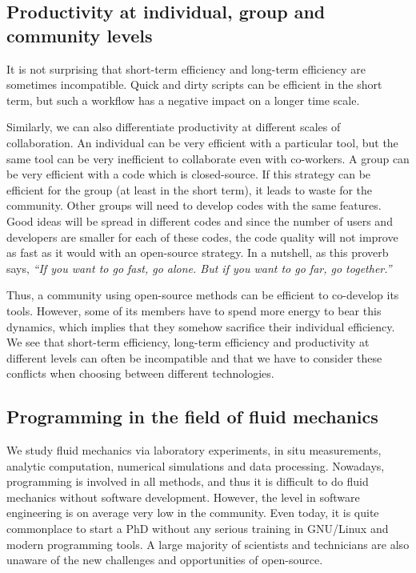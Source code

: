 \subsection{Productivity at individual, group and community levels}

It is not surprising
%
that short-term efficiency and long-term efficiency are
sometimes incompatible.
%
Quick and dirty scripts can be efficient in the short term, but such a workflow
has a negative impact on a longer time scale.

Similarly, we can also differentiate productivity at different scales of
collaboration.
%
An individual can be very efficient with a particular tool, but the same tool
can be very inefficient to collaborate even with co-workers.
%
A group can be very efficient with a code which is closed-source.  If this
strategy can be efficient for the group (at least in the short term), it leads
to waste for the community. Other groups will need to develop codes with the
same features.  Good ideas will be spread in different codes and since the
number of users and developers are smaller for each of these codes, the code
quality will not improve as fast as it would with an open-source strategy. In a
nutshell, as this proverb says, \textit{``If you want to go fast, go alone. But
if you want to go far, go together.''}

Thus, a community using open-source methods can be efficient to co-develop its
tools. However, some of its members have to spend more energy to bear this
dynamics, which implies that they somehow sacrifice their individual efficiency.
We see that short-term efficiency, long-term efficiency and productivity at
different levels can often be incompatible and that we have to consider these
conflicts when choosing between different technologies.

\subsection{Programming in the field of fluid mechanics}

We study fluid mechanics via laboratory experiments, in situ measurements,
analytic computation, numerical simulations and data processing.
%
Nowadays, programming is involved in all methods, and thus it is difficult to do
fluid mechanics without software development.
%
However, the level in software engineering is on average very low in the
community.
%
Even today, it is quite commonplace to start a PhD without any serious training in
GNU/Linux and modern programming tools.
%
A large majority of scientists and technicians are also unaware of the new
challenges and opportunities of open-source.

